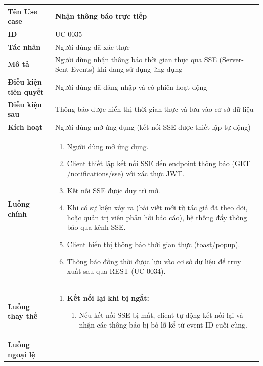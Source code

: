 {
\renewcommand{\arraystretch}{1.5}

\begin{tabularx}{\textwidth}{|>{\raggedright\arraybackslash}X|>{\raggedright\arraybackslash}X|}
\hline
\textbf{Tên Use case} & Nhận thông báo trực tiếp \\
\hline
\textbf{ID} & UC-0035 \\
\hline
\textbf{Tác nhân} & Người dùng đã xác thực \\
\hline
\textbf{Mô tả} & Người dùng nhận thông báo thời gian thực qua SSE (Server-Sent Events) khi đang sử dụng ứng dụng \\
\hline
\textbf{Điều kiện tiên quyết} & Người dùng đã đăng nhập và có phiên hoạt động \\
\hline
\textbf{Điều kiện sau} & Thông báo được hiển thị thời gian thực và lưu vào cơ sở dữ liệu \\
\hline
\textbf{Kích hoạt} & Người dùng mở ứng dụng (kết nối SSE được thiết lập tự động) \\
\hline
\textbf{Luồng chính} &
\begin{enumerate}
    \item Người dùng mở ứng dụng.
    \item Client thiết lập kết nối SSE đến endpoint thông báo (GET /notifications/sse) với xác thực JWT.
    \item Kết nối SSE được duy trì mở.
    \item Khi có sự kiện xảy ra (bài viết mới từ tác giả đã theo dõi, hoặc quản trị viên phản hồi báo cáo), hệ thống đẩy thông báo qua kênh SSE.
    \item Client hiển thị thông báo thời gian thực (toast/popup).
    \item Thông báo đồng thời được lưu vào cơ sở dữ liệu để truy xuất sau qua REST (UC-0034).
\end{enumerate} \\
\hline
\textbf{Luồng thay thế} &
\begin{enumerate}
    \item \textbf{Kết nối lại khi bị ngắt:}
    \begin{enumerate}
        \item[3A.] Nếu kết nối SSE bị mất, client tự động kết nối lại và nhận các thông báo bị bỏ lỡ kể từ event ID cuối cùng.
    \end{enumerate}
\end{enumerate} \\
\hline
\textbf{Luồng ngoại lệ} &
\begin{enumerate}

\end{enumerate}
\end{tabularx}}
